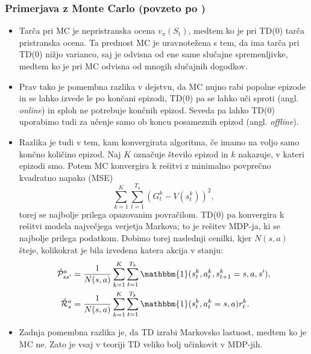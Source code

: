 \documentclass[12pt,a4paper]{amsart}
\theoremstyle{definition} %
\theoremstyle{plain} %
\begin{document}
\subsubsection{Primerjava z Monte Carlo (povzeto po \cite{LecNotesSilver})}
\begin{itemize}
    \item Tarča pri MC je nepristranska ocena $v_\pi(S_t)$, medtem ko je pri TD($0$) tarča 
    pristranska ocena. Ta prednost MC je uravnotežena s tem, da ima tarča pri TD($0$) nižjo varianco, 
    saj je odvisna od ene same slučajne spremenljivke, medtem ko je pri MC odvisna od mnogih 
    slučajnih dogodkov.
    
    \item Prav tako je pomembna razlika v dejstvu, da MC nujno rabi popolne epizode in se lahko
    izvede le po končani epizodi, TD($0$) pa se lahko uči sproti (angl. \textit{online}) in sploh 
    ne potrebuje končnih epizod. Seveda pa lahko TD($0$) uporabimo tudi za učenje samo ob koncu 
    posameznih epizod (angl. \textit{offline}).

    \item Razlika je tudi v tem, kam konvergirata algoritma, če imamo na voljo samo končno 
    količino epizod. Naj $K$ označuje število epizod in $k$ nakazuje, v kateri epizodi smo. Potem 
    MC konvergira k rešitvi z minimalno povprečno kvadratno napako (MSE) 
    $$
    \sum_{k=1}^K \sum_{t=1}^{T_k} (G_t^k - V(s_t^k))^2,
    $$
    torej se najbolje prilega opazovanim povračilom. TD($0$) pa konvergira k rešitvi modela največjega 
    verjetja Markova; to je rešitev MDP-ja, ki se najbolje prilega podatkom. Dobimo torej naslednji 
    cenilki, kjer $N(s, a)$ šteje, kolikokrat je bila izvedena katera akcija v stanju:
    \begin{align*}
        \hat{\mathcal{P}}_{ss'}^a &= \frac{1}{N(s, a)} \sum_{k=1}^K \sum_{t=1}^{T_k} 
                \mathbbm{1}(s_t^k, a_t^k, s_{t+1}^k = s, a, s'), \\
        \hat{\mathcal{R}}_{s}^a &= \frac{1}{N(s, a)} \sum_{k=1}^K \sum_{t=1}^{T_k} 
                \mathbbm{1}(s_t^k, a_t^k = s, a)r_t^k.
    \end{align*}

    \item Zadnja pomembna razlika je, da TD izrabi Markovsko lastnost, medtem ko je MC ne. Zato je 
    vsaj v teoriji TD veliko bolj učinkovit v MDP-jih.
\end{itemize}
\end{document}
